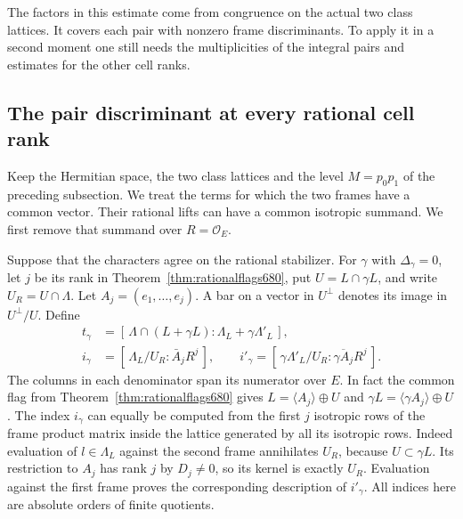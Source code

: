 \documentclass[a4paper,11pt]{article}
\theoremstyle{definition}
\theoremstyle{remark}
\numberwithin{equation}{section}
\begin{document}
The factors in this estimate come from congruence on the actual
two class lattices. It covers each pair with nonzero frame
discriminants. To apply it in a second moment one still needs
the multiplicities of the integral pairs and estimates for the
other cell ranks.


\subsection{The pair discriminant at every rational cell rank}
\label{sec:allpair689}

Keep the Hermitian space, the two class lattices and the level
\(M=p_0p_1\) of the preceding subsection. We treat the terms
for which the two frames have a common vector. Their rational
lifts can have a common isotropic summand. We first remove
that summand over \(R=\mathcal O_E\).

Suppose that the characters agree on the rational stabilizer.
For \(\gamma\) with \(\Delta_\gamma=0\), let \(j\) be its rank in
Theorem~\ref{thm:rationalflags680}, put \(U=L\cap\gamma L\), and
write \(U_R=U\cap\Lambda\). Let \(A_j=(e_1,\ldots,e_j)\). A bar on a
vector in \(U^\perp\) denotes its image in \(U^\perp/U\).
Define
\[
 \begin{split}
 t_\gamma&=[\,\Lambda\cap(L+\gamma L):
                         \Lambda_L+\gamma\Lambda'_L\,],\\
 i_\gamma&=[\,\Lambda_L/U_R:\bar A_j R^j\,],\qquad
 i'_\gamma=[\,\gamma\Lambda'_L/U_R:\overline{\gamma A_j}R^j\,].
 \end{split}
\]
The columns in each denominator span its numerator over \(E\).
In fact the common flag from Theorem~\ref{thm:rationalflags680}
gives \(L=\langle A_j\rangle\oplus U\) and
\(\gamma L=\langle\gamma A_j\rangle\oplus U\).
The index \(i_\gamma\) can equally be computed from the first
\(j\) isotropic rows of the frame product matrix inside the
lattice generated by all its isotropic rows. Indeed evaluation of
\(l\in\Lambda_L\) against the second frame annihilates \(U_R\),
because \(U\subset\gamma L\). Its restriction to \(A_j\) has
rank \(j\) by \(D_j\ne0\), so its kernel is exactly \(U_R\).
Evaluation against the first frame proves the corresponding
description of \(i'_\gamma\). All indices here are absolute
orders of finite quotients.
\end{document}
